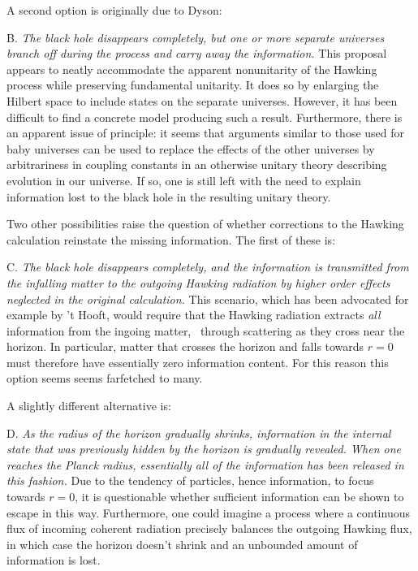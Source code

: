 A second option is originally due to Dyson:
\itemskip
\item{B.} {\it The black hole disappears completely, but one or more
separate universes branch off during the process and carry away the
information. }
\itemskip
This proposal appears to neatly accommodate the apparent nonunitarity of the
Hawking process while preserving fundamental unitarity.  It does so by
enlarging
the Hilbert space to include states on the separate universes.  However, it
has been difficult to find a concrete model producing such a result.
Furthermore, there is an apparent issue of principle:  it seems that arguments
similar to those used for baby universes can
be used to replace the effects of the other universes by
arbitrariness in coupling constants in an otherwise unitary theory
describing evolution in
our universe.  If so,
one is still left with the need to explain
information lost to the black hole in the resulting unitary
theory.

Two other possibilities raise the question of whether corrections to
the Hawking calculation reinstate the missing information.  The first
of these is:
\medskip
\noindent
\item{C.}  {\it The black hole disappears completely, and the information
is transmitted from the infalling matter to the outgoing Hawking
radiation by higher order effects neglected in the original
calculation.  }
\medskip
\noindent
This scenario, which has been advocated for example by 't Hooft,
would require that the Hawking radiation
extracts {\it all} information from the ingoing matter, \eg\ through scattering
as they cross near the horizon.  In particular, matter that crosses the
horizon and falls towards $r=0$ must therefore have essentially zero
information
content.  For this reason this option seems
seems farfetched to many.

A slightly different alternative  is:

\itemskip
\item{D.}  {\it As the radius of the horizon gradually shrinks,
information in the internal state that was previously hidden by the
horizon is gradually revealed.  When one reaches the Planck radius,
essentially all of the information has been released in this
fashion.}
\itemskip
Due to the tendency of particles, hence information, to focus towards
$r=0$, it is questionable whether sufficient information can be shown
to escape in this way.  Furthermore, one could imagine a process where a
continuous flux of incoming coherent radiation precisely balances the outgoing
Hawking flux, in which case the horizon doesn't shrink and an unbounded
amount of information is lost.

